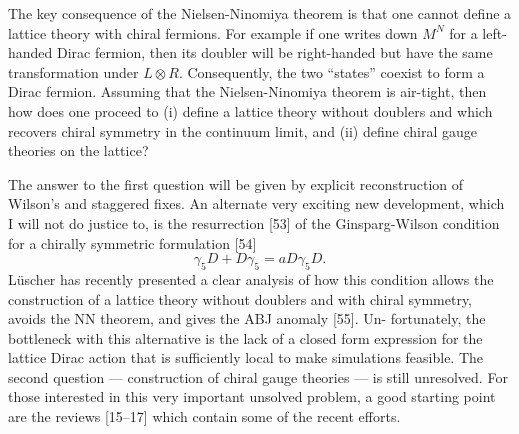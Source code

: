 The key consequence of the Nielsen-Ninomiya theorem is that one cannot
define a lattice theory with chiral fermions. For example if one writes
down $M^N$ for a left-handed Dirac fermion, then its doubler will be
right-handed but have the same transformation under $L \otimes R$. Consequently,
the two ``states'' coexist to form a Dirac fermion. Assuming that the
Nielsen-Ninomiya theorem is air-tight, then how does one proceed to (i)
define a lattice theory without doublers and which recovers chiral symmetry
in the continuum limit, and (ii) define chiral gauge theories on the lattice?

The answer to the first question will be given by explicit reconstruction of
Wilson's and staggered fixes. An alternate very exciting new development,
which I will not do justice to, is the resurrection [53] of the Ginsparg-Wilson
condition for a chirally symmetric formulation [54]
\begin{equation}
\gamma_5 D + D\gamma_5 = a D \gamma_5 D .
\end{equation}
L\"uscher has recently presented a clear analysis of how this condition
allows the construction of a lattice theory without doublers and with chiral
symmetry, avoids the NN theorem, and gives the ABJ anomaly [55]. Un-
fortunately, the bottleneck with this alternative is the lack of a closed form
expression for the lattice Dirac action that is sufficiently local to make
simulations feasible. The second question --- construction of chiral gauge
theories --- is still unresolved. For those interested in this very important
unsolved problem, a good starting point are the reviews [15--17] which
contain some of the recent efforts.
